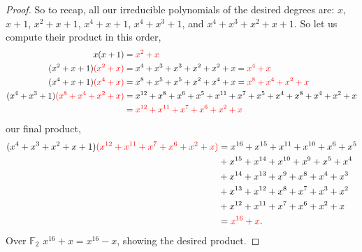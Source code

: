 \documentclass[11pt]{article}
\newcommand{\ff}{\mathbb F}   %
\newcommand{\tcr}[1]{\textcolor{red}{#1}}
\begin{document}
\begin{proof}
        So to recap, all our irreducible polynomials of the desired degrees are: $x$, $x + 1$, $x^{2} + x + 1$, $x^{4} + x + 1$, $x^{4} + x^{3} + 1$, and $x^{4} + x^{3} + x^{2}+ x + 1 $. So let us compute their product in this  order,
        \begin{align*}
            x(x + 1) &= \tcr{x^{2} + x}  \\
            (x^{2} + x + 1)\tcr{(x^{2} + x)} &= x^{4} + x^{3} + x^{3} + x^{2} + x^{2} + x = \tcr{x^{4} + x} \\
            (x^{4} + x + 1)\tcr{(x^{4} + x)} &= x^{8} + x^{5}+ x^{5} + x^{2} + x^{4} + x = \tcr{x^{8} + x^{4} + x^{2} + x} \\
            (x^{4} + x^{3} + 1)\tcr{(x^{8} + x^{4} + x^{2} + x)} &= x^{12} + x^{8} + x^{6} + x^{5} + x^{11} + x^{7} + x^{5} + x^{4} + x^{8} + x^{4} + x^{2} + x \\
            &= \tcr{x^{12} + x^{11} + x^{7} + x^{6} + x^{2} + x} \\
        \end{align*}
        our final product, 
        \begin{align*}
            (x^{4} + x^{3} + x^{2} + x + 1)\tcr{(x^{12} + x^{11} + x^{7} + x^{6} + x^{2} + x)} &= x^{16} + x^{15} + x^{11} + x^{10} + x^{6} + x^{5}\\& + x^{15} + x^{14} + x^{10} + x^{9} + x^{5} + x^{4}\\ & + x^{14} + x^{13} + x^{9} + x^{8} + x^{4} + x^{3}\\& + x^{13}+ x^{12} + x^{8} + x^{7}  + x^{3} + x^{2} \\&+ x^{12} + x^{11} + x^{7}+ x^{6} + x^{2} + x \\
            &= \tcr{x^{16} + x}.
        \end{align*}
        Over $\ff_2$ $x^{16} + x = x^{16} -x$, showing the desired product. 
    \end{proof}
\end{document}
